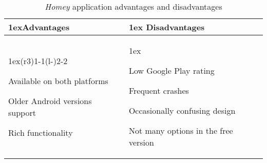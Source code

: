 \begin{table}[htb]
\begin{tabularx}{\linewidth}{>{\parskip1ex}X@{\kern4\tabcolsep}>{\parskip1ex}X}
\toprule
\hfil\bfseries Advantages
&
\hfil\bfseries Disadvantages
\\
\cmidrule(r{3\tabcolsep}){1-1}\cmidrule(l{-\tabcolsep}){2-2}

Available on both platforms\par
Older Android versions support\par
Rich functionality

&

Low Google Play rating\par
Frequent crashes\par
Occasionally confusing design\par
Not many options in the free version

\\
\bottomrule
\end{tabularx}
\caption{\textit{Homey} application advantages and disadvantages}
\label{tab:applications:homey}
\end{table}